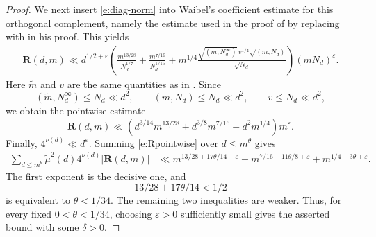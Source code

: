 \documentclass[12pt,a4paper,reqno]{amsart}
\numberwithin{equation}{section}
\theoremstyle{plain}
\theoremstyle{definition}
\begin{document}
\begin{proof}
We next insert \eqref{e:diag-norm} into Waibel's coefficient estimate for this orthogonal complement, namely the estimate used in the proof of \cite[Lemma 13]{Wa} by replacing \cite[Theorem 1]{Wa} with \cite[Theorem 2]{Wa} in his proof. This yields
\begin{align}\label{e:Rpointwise-new}
\mathbf R(d,m)
\ll d^{1/2+\varepsilon}
\left(
\frac{m^{13/28}}{N_d^{1/7}}
+
\frac{m^{7/16}}{N_d^{1/16}}
+
 m^{1/4}
\frac{\sqrt{(\widetilde m,N_d^\infty)}\,v^{1/4}\sqrt{(m,N_d)}}{\sqrt{N_d}}
\right)(mN_d)^\varepsilon.
\end{align}
Here $\widetilde m$ and $v$ are the same quantities as in \cite[Lemma 13]{Wa}. Since
\[
(\widetilde m,N_d^\infty)\leq N_d\ll d^2,
\qquad
(m,N_d)\leq N_d\ll d^2,
\qquad
v\leq N_d\ll d^2,
\]
we obtain the pointwise estimate
\begin{equation}\label{e:Rpointwise}
\mathbf R(d,m)
\ll
\left(d^{3/14}m^{13/28}+d^{3/8}m^{7/16}+d^2m^{1/4}\right)m^\varepsilon.
\end{equation}
Finally, $4^{\nu(d)}\ll d^\varepsilon$. Summing \eqref{e:Rpointwise} over $d\leq m^\theta$ gives
\begin{align*}
\sum_{d\leq m^\theta}\widetilde\mu^2(d)4^{\nu(d)}|\mathbf R(d,m)|
&\ll
m^{13/28+17\theta/14+\varepsilon}
+m^{7/16+11\theta/8+\varepsilon}
+m^{1/4+3\theta+\varepsilon}.
\end{align*}
The first exponent is the decisive one, and
\[
13/28+17\theta/14<1/2
\]
is equivalent to $\theta<1/34$. The remaining two inequalities are weaker. Thus, for every fixed $0<\theta<1/34$, choosing $\varepsilon>0$ sufficiently small gives the asserted bound with some $\delta>0$.
\end{proof}
\end{document}
